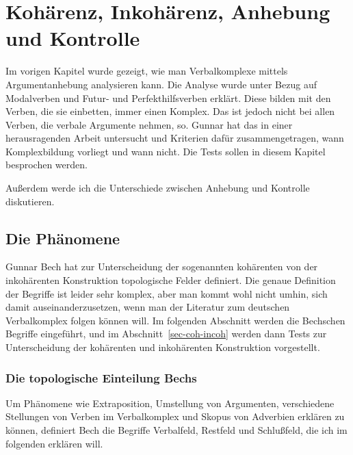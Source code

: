 

\chapter{Kohärenz, Inkohärenz, Anhebung und Kontrolle}
\label{chap-anhebung}

Im vorigen Kapitel wurde gezeigt, wie man Verbalkomplexe mittels
Argumentanhebung analysieren kann. Die Analyse wurde unter Bezug auf
Modalverben und Futur- und Perfekthilfsverben erklärt. Diese bilden
mit den Verben, die sie einbetten, immer einen Komplex.
Das ist jedoch nicht bei allen Verben, die verbale Argumente nehmen,
so. Gunnar \citet{Bech55a} hat das in einer herausragenden
Arbeit untersucht und Kriterien dafür zusammengetragen,
wann Komplexbildung vorliegt und wann nicht. Die Tests sollen
in diesem Kapitel besprochen werden. 

Außerdem werde ich die Unterschiede zwischen Anhebung und Kontrolle diskutieren.

\section{Die Phänomene}


Gunnar Bech hat zur Unterscheidung der sogenannten kohärenten von der inkohärenten
Konstruktion topologische Felder definiert. Die genaue Definition der
Begriffe ist leider sehr komplex, aber man kommt wohl nicht umhin,
sich damit auseinanderzusetzen, wenn man der Literatur zum deutschen
Verbalkomplex folgen können will. Im folgenden Abschnitt werden die Bechschen
Begriffe eingeführt, und im Abschnitt~\ref{sec-coh-incoh} werden dann
Tests zur Unterscheidung der kohärenten und inkohärenten Konstruktion vorgestellt.

\subsection{Die topologische Einteilung Bechs}
\label{topo-bech}

Um Phänomene wie Extraposition, 
Umstellung von Argumenten, verschiedene Stellungen von Verben im Verbalkomplex
und Skopus von Adverbien erklären zu können, 
definiert Bech die Begriffe Verbalfeld, Restfeld und Schlußfeld, %
die ich im folgenden erklären will.

